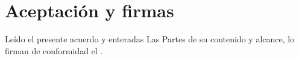 
\section{Aceptación y firmas}

Leído el presente acuerdo y enteradas Las Partes de su contenido y alcance, lo firman de conformidad el \FechaAcuerdo.

\vspace{1cm}

\noindent
{}%
\hfill
{}
